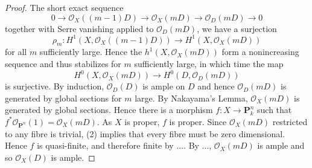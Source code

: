 \begin{proof}
The short exact sequence
$$
  0 \to \mathcal{O}_X((m-1)D) \to \mathcal{O}_X(mD) \to \mathcal{O}_D(mD) \to 0
$$
together with Serre vanishing applied to $\mathcal{O}_D(mD)$,
we have a surjection
$$
\rho_m \colon H^1(X,\mathcal{O}_X((m -1)D)) \to H^1(X,\mathcal{O}_X(mD))
$$
for all $m$ sufficiently large.
Hence the $h^1(X,\mathcal{O}_X(mD))$ form a nonincreasing sequence and thus
stabilizes for $m$ sufficiently large, in which time the map
$$
H^0(X,\mathcal{O}_X(mD)) \to H^0(D,\mathcal{O}_D(mD))
$$
is surjective.
By induction, $\mathcal{O}_D(D)$ is ample on $D$ and hence $\mathcal{O}_D(mD)$
is generated by global sections for $m$ large.
By Nakayama's Lemma, $\mathcal{O}_X(mD)$ is generated by global sections.
Hence there is a morphism $f : X \to \mathbf{P}^n_k$ such that
$f^*\mathcal{O}_{\mathbf{P}^n}(1) = \mathcal{O}_X(mD)$.
As $X$ is proper, $f$ is proper.
Since $\mathcal{O}_X(mD)$ restricted to any fibre is trivial, (2) implies that
every fibre must be zero dimensional.
Hence $f$ is quasi-finite, and therefore finite by ....
By ..., $\mathcal{O}_X(mD)$ is ample
and so $\mathcal{O}_X(D)$ is ample.
\end{proof}




